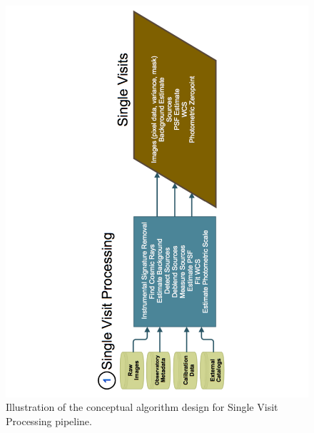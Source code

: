 \documentclass[12pt]{article}
\begin{document}
\begin{figure}[!t]
    \centering
    \vskip -1.1in
    \includegraphics[scale=0.505, angle=270]{gliffy/SingleVisitProcessing}
    \vskip -1.1in
    \caption{Illustration of the conceptual algorithm design for Single Visit Processing pipeline.\label{fig:Pipe1}}
\end{figure}
\end{document}

